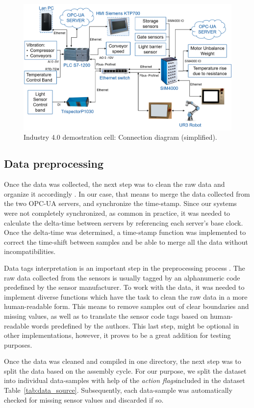 \documentclass[5p,times,procedia]{elsarticle}
\begin{document}
\begin{figure}
       \includegraphics[width=.45\textwidth]{img/demozelle_conex_diagram.png}
       \caption{Industry 4.0 demostration cell: Connection diagram (simplified).
             }
\label{fig:demo_conn_diag}
\end{figure}

\subsection{Data preprocessing}

Once the data was collected, the next step was to clean the raw data and organize it accordingly \cite{bishop2006pattern}. In our case, that means to merge the data collected from the two OPC-UA servers, and synchronize the time-stamp. Since our systems were not completely synchronized, as common in practice, it was needed to calculate the delta-time between servers by referencing each server's base clock. Once the delta-time was determined, a time-stamp function was implemented to correct the time-shift between samples and be able to merge all the data without incompatibilities.

Data tags interpretation is an important step in the preprocessing process \cite{bishop2006pattern}. The raw data collected from the sensors is usually tagged by an alphanumeric code predefined by the sensor manufacturer. To work with the data, it was needed to implement diverse functions which have the task to clean the raw data in a more human-readable form. This means to remove samples out of clear boundaries and missing values, as well as to translate the sensor code tags based on human-readable words predefined by the authors. This last step, might be optional in other implementations, however, it proves to be a great addition for testing purposes.

Once the data was cleaned and compiled in one directory, the next step was to split the data based on the assembly cycle. For our purpose, we split the dataset into individual data-samples with help of the \textit{action flags}included in the dataset Table~\ref{tab:data_source}. Subsequently, each data-sample was automatically checked for missing sensor values and discarded if so.
\end{document}
